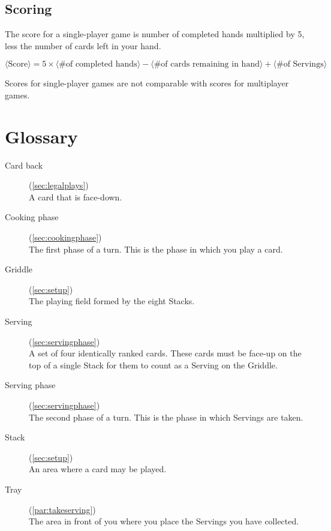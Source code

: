 \documentclass{article}
\begin{document}
\subsection{Scoring \label{sec:solitairescoring}}

The score for a single-player game is number of completed hands multiplied by 5, less the number of cards left in your hand.

$$
\langle\textrm{Score}\rangle = 5 \times \langle\textrm{\# of completed hands}\rangle - \langle\textrm{\# of cards remaining in hand}\rangle + \langle\textrm{\# of Servings}\rangle
$$

Scores for single-player games are not comparable with scores for multiplayer games.

\pagebreak
\section{Glossary \label{sec:glossary}}

\begin{description}
  \item[Card back] (\autoref{sec:legalplays})\\
    A card that is face-down.
  \item[Cooking phase] (\autoref{sec:cookingphase})\\
    The first phase of a turn. This is the phase in which you play a card.
  \item[Griddle] (\autoref{sec:setup})\\
    The playing field formed by the eight Stacks.
  \item[Serving] (\autoref{sec:servingphase})\\
    A set of four identically ranked cards. These cards must be face-up on the top of a single Stack for them to count as a Serving on the Griddle.
  \item[Serving phase] (\autoref{sec:servingphase})\\
    The second phase of a turn. This is the phase in which Servings are taken.
  \item[Stack] (\autoref{sec:setup})\\
    An area where a card may be played.
  \item[Tray] (\autoref{par:takeserving})\\
    The area in front of you where you place the Servings you have collected.
\end{description}

\newpage
\appendix
\renewcommand{\thesection}{\Alph{section}}
\end{document}
